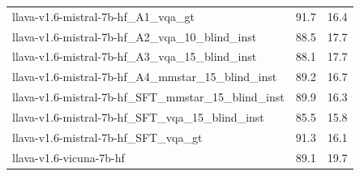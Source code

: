 \begin{tabular}{lrr}
llava-v1.6-mistral-7b-hf_A1_vqa_gt & 91.7 & 16.4 \\
llava-v1.6-mistral-7b-hf_A2_vqa_10_blind_inst & 88.5 & 17.7 \\
llava-v1.6-mistral-7b-hf_A3_vqa_15_blind_inst & 88.1 & 17.7 \\
llava-v1.6-mistral-7b-hf_A4_mmstar_15_blind_inst & 89.2 & 16.7 \\
llava-v1.6-mistral-7b-hf_SFT_mmstar_15_blind_inst & 89.9 & 16.3 \\
llava-v1.6-mistral-7b-hf_SFT_vqa_15_blind_inst & 85.5 & 15.8 \\
llava-v1.6-mistral-7b-hf_SFT_vqa_gt & 91.3 & 16.1 \\
llava-v1.6-vicuna-7b-hf & 89.1 & 19.7 \\
\bottomrule
\end{tabular}
